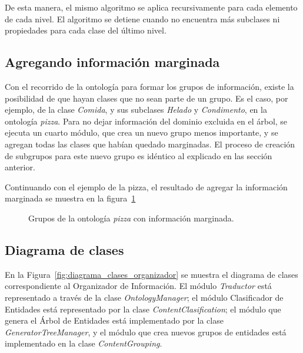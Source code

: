 De esta manera, el mismo algoritmo se aplica recursivamente para cada elemento de cada nivel. El algoritmo se detiene cuando no encuentra más subclases ni propiedades para cada clase del último nivel.

\subsection{Agregando información marginada}
Con el recorrido de la ontología para formar los grupos de información, existe la posibilidad de que hayan clases que no sean parte de un grupo. Es el caso, por ejemplo, de la clase \emph{Comida}, y sus subclases \emph{Helado} y \emph{Condimento}, en la ontología \emph{pizza}. Para no dejar información del dominio excluida en el árbol, se ejecuta un cuarto módulo, que crea un nuevo grupo menos importante, y se agregan todas las clases que habían quedado marginadas. El proceso de creación de subgrupos para este nuevo grupo es idéntico al explicado en las sección anterior.

Continuando con el ejemplo de la pizza, el resultado de agregar la  información marginada se muestra en la figura~\ref{fig:macro_planning_pizza_marg}

\begin{figure}[H]
\centering
\begin{minipage}[c]{0.7\textwidth}
{\footnotesize 
{}
}
\caption{Grupos de la ontología \emph{pizza} con información marginada.}
\label{fig:macro_planning_pizza_marg}
\end{minipage}
\end{figure}

\subsection{Diagrama de clases}
En la Figura~\ref{fig:diagrama_clases_organizador} se muestra el diagrama de clases correspondiente al Organizador de Información. El módulo \emph{Traductor} está representado a través de la clase \emph{OntologyManager}; el módulo Clasificador de Entidades está representado por la clase \emph{ContentClasification}; el módulo que genera el Árbol de Entidades está implementado por la clase \emph{GeneratorTreeManager}, y el módulo que crea nuevos grupos de entidades está implementado en la clase \emph{ContentGrouping}. 

